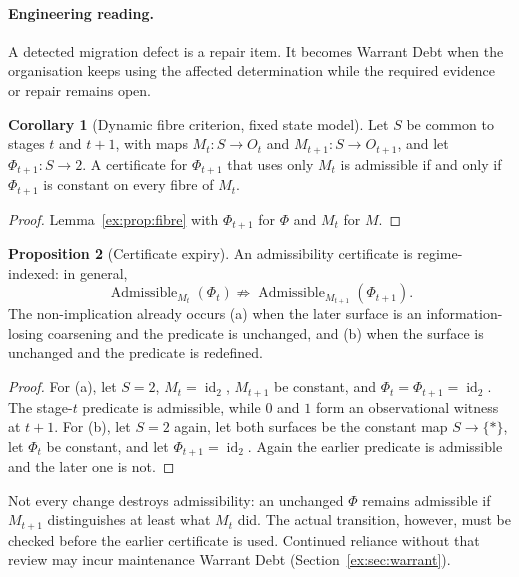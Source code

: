 \documentclass[11pt]{article}
\theoremstyle{definition}
\newtheorem{proposition}{Proposition}[section]
\newtheorem{corollary}[proposition]{Corollary}
\begin{document}
\paragraph{Engineering reading.} A detected migration defect is a repair item. It becomes Warrant Debt when the organisation keeps using the affected determination while the required evidence or repair remains open.

\begin{corollary}[Dynamic fibre criterion, fixed state model]\label{ex:cor:dynfibre}
Let $S$ be common to stages $t$ and $t+1$, with maps $M_t:S\to O_t$ and $M_{t+1}:S\to O_{t+1}$, and let $\Phi_{t+1}:S\to 2$. A certificate for $\Phi_{t+1}$ that uses only $M_t$ is admissible if and only if $\Phi_{t+1}$ is constant on every fibre of $M_t$.
\end{corollary}

\begin{proof}
Lemma~\ref{ex:prop:fibre} with $\Phi_{t+1}$ for $\Phi$ and $M_t$ for $M$.
\end{proof}

\begin{proposition}[Certificate expiry]\label{ex:prop:certificate-expiry}
An admissibility certificate is regime-indexed: in general,
\[
\operatorname{Admissible}_{M_t}(\Phi_t)
\not\Longrightarrow
\operatorname{Admissible}_{M_{t+1}}(\Phi_{t+1}).
\]
The non-implication already occurs (a) when the later surface is an information-losing coarsening and the predicate is unchanged, and (b) when the surface is unchanged and the predicate is redefined.
\end{proposition}

\begin{proof}
For (a), let $S=2$, $M_t=\operatorname{id}_2$, $M_{t+1}$ be constant, and $\Phi_t=\Phi_{t+1}=\operatorname{id}_2$. The stage-$t$ predicate is admissible, while $0$ and $1$ form an observational witness at $t+1$. For (b), let $S=2$ again, let both surfaces be the constant map $S\to\{*\}$, let $\Phi_t$ be constant, and let $\Phi_{t+1}=\operatorname{id}_2$. Again the earlier predicate is admissible and the later one is not.
\end{proof}

Not every change destroys admissibility: an unchanged $\Phi$ remains admissible if $M_{t+1}$ distinguishes at least what $M_t$ did. The actual transition, however, must be checked before the earlier certificate is used. Continued reliance without that review may incur maintenance Warrant Debt (Section~\ref{ex:sec:warrant}).
\end{document}
